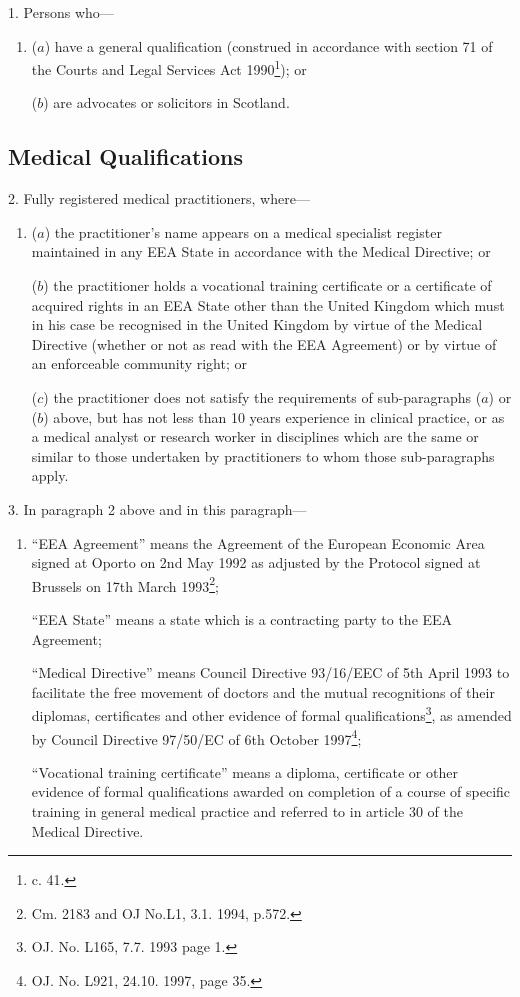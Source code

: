 \documentclass[12pt,a4paper]{article}
\begin{document}
\renewcommand\parthead{--- Schedule 3}

1.  Persons who—
\begin{enumerate}\item[]
($a$) have a general qualification (construed in accordance with section 71 of the Courts and Legal Services Act 1990\footnote{ c. 41.}); or

($b$) are advocates or solicitors in Scotland.
\end{enumerate}

\subsection*{Medical Qualifications}

2.  Fully registered medical practitioners, where—
\begin{enumerate}\item[]
($a$) the practitioner’s name appears on a medical specialist register maintained in any EEA State in accordance with the Medical Directive; or

($b$) the practitioner holds a vocational training certificate or a certificate of acquired rights in an EEA State other than the United Kingdom which must in his case be recognised in the United Kingdom by virtue of the Medical Directive (whether or not as read with the EEA Agreement) or by virtue of an enforceable community right; or

($c$) the practitioner does not satisfy the requirements of sub-paragraphs ($a$) or ($b$) above, but has not less than 10 years experience in clinical practice, or as a medical analyst or research worker in disciplines which are the same or similar to those undertaken by practitioners to whom those sub-paragraphs apply.
\end{enumerate}

\medskip

3.  In paragraph 2 above and in this paragraph—
\begin{enumerate}\item[]
“EEA Agreement” means the Agreement of the European Economic Area signed at Oporto on 2nd May 1992 as adjusted by the Protocol signed at Brussels on 17th March 1993\footnote{\frenchspacing Cm. 2183 and OJ No.L1, 3.1. 1994, p.572.};

“EEA State” means a state which is a contracting party to the EEA Agreement;

\enlargethispage{\baselineskip}

“Medical Directive” means Council Directive 93/16/EEC of 5th April 1993 to facilitate the free movement of doctors and the mutual recognitions of their diplomas, certificates and other evidence of formal qualifications\footnote{\frenchspacing OJ. No. L165, 7.7. 1993 page 1.}, as amended by Council Directive 97/50/EC of 6th October 1997\footnote{\frenchspacing OJ. No. L921, 24.10. 1997, page 35.};

“Vocational training certificate” means a diploma, certificate or other evidence of formal qualifications awarded on completion of a course of specific training in general medical practice and referred to in article 30 of the Medical Directive.
\end{enumerate}
\end{document}
